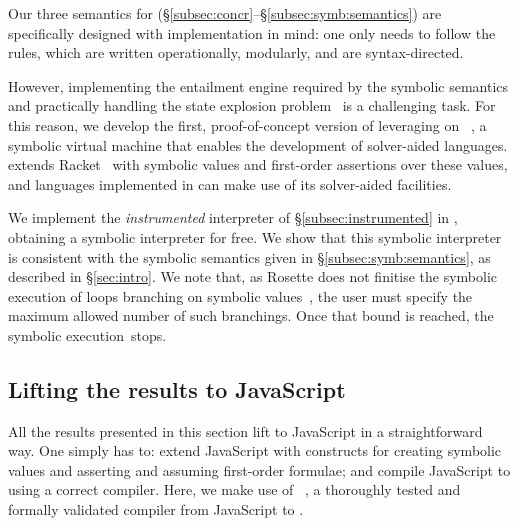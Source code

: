 Our three semantics for \jsil (\S\ref{subsec:concr}--\S\ref{subsec:symb:semantics}) are specifically designed with implementation in mind: one only needs to follow the rules, which are written operationally, modularly, and are syntax-directed. 

However, implementing the entailment engine required by the symbolic semantics and practically handling the state explosion problem~\cite{clarke:lpar:2008} is a challenging task. For this reason, we develop the first, proof-of-concept version of \cosette leveraging on 
\rosette~\cite{Rosette1,Rosette2}, a symbolic virtual machine that enables the development of solver-aided languages. \rosette extends Racket~\cite{racket} with symbolic values and first-order assertions over these values, and languages implemented in \rosette can make use of its solver-aided facilities. 

We implement the \emph{instrumented} \jsil interpreter of \S\ref{subsec:instrumented} in \rosette, obtaining a \jsil symbolic interpreter for free. We show that this symbolic interpreter is consistent with the symbolic semantics given in \S\ref{subsec:symb:semantics}, as described in \S\ref{sec:intro}.
We note that, as Rosette does not finitise the symbolic execution of loops branching on symbolic values~\cite{abstract:symbolic:exec}, the user must specify the maximum allowed number of such branchings. Once that bound is reached, the symbolic execution~stops.

\vspace*{-0.2cm}
\subsection{Lifting the results to JavaScript}
\label{subsec:liftmejs1}

All the results presented in this section lift to JavaScript in a straightforward way.
One simply has to: 
 extend JavaScript with constructs for creating symbolic values and 
asserting and assuming first-order formulae; and
 compile JavaScript to \jsil using a correct compiler. 
Here, we make use of \jstojsil~\cite{javert}, a thoroughly tested and formally validated compiler from 
JavaScript to \jsil.

